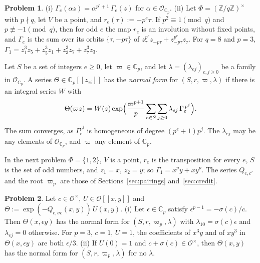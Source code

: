 \documentclass[reqno]{amsart}
\theoremstyle{definition}
\newtheorem{problem}{Problem}[section]
\theoremstyle{plain}
\newcommand{\Z}{\mathbb{Z}}
\newcommand{\Oc}{\mathcal{O}}
\newcommand{\C}{\mathbb{C}}
\newcommand{\Op}{\mathcal{O}_{\C_p}}
\begin{document}
\begin{problem}\label{pr:coupling}
(i) \(\Gamma_e(\alpha z) = \alpha^{p^e + 1}\, \Gamma_e(z)\) for \(\alpha \in \Op\).
(ii) Let \(\Phi = (\Z/q\Z)^\times\) with \(p \nmid q\), let \(V\) be a point, and \(r_e(\tau) := -p^e \tau\).  If \(p^2 \equiv 1 \pmod q\) and \(p \not\equiv -1 \pmod q\), then for odd \(e\) the map \(r_e\) is an involution without fixed points, and \(\Gamma_e\) is the sum over its orbits \(\{\tau, -p\tau\}\) of \(z_\tau^{p^e} z_{-p\tau} + z_{-p\tau}^{p^e} z_\tau\).  For \(q = 8\) and \(p = 3\), \(\Gamma_1 = z_1^3 z_5 + z_5^3 z_1 + z_3^3 z_7 + z_7^3 z_3\).
\end{problem}

Let \(S\) be a set of integers \(e \ge 0\), let \(\varpi \in \C_p\), and let \(\lambda = (\lambda_{ej})_{e, j \ge 0}\) be a family in \(\Op\).  A series \(\Theta \in \C_p[[z_{\tau i}]]\) has the \emph{normal form} for \((S, r, \varpi, \lambda)\) if there is an integral series \(W\) with
\[
  \Theta(\varpi z) = W(z) \exp\Bigl( \frac{\varpi^{p+1}}{p} \sum_{e \in S} \sum_{j \ge 0} \lambda_{ej}\, \Gamma_e^{\,p^j} \Bigr) .
\]
The sum converges, as \(\Gamma_e^{p^j}\) is homogeneous of degree \((p^e + 1)p^j\).  The \(\lambda_{ej}\) may be any elements of \(\Op\), and \(\varpi\) any element of \(\C_p\).

In the next problem \(\Phi = \{1, 2\}\), \(V\) is a point, \(r_e\) is the transposition for every \(e\), \(S\) is the set of odd numbers, and \(z_1 = x\), \(z_2 = y\); so \(\Gamma_1 = x^p y + x y^p\).  The series \(Q_{c,c'}\) and the root \(\varpi_p\) are those of Sections~\ref{sec:pairings} and~\ref{sec:credit}.

\begin{problem}\label{pr:nf-two}
Let \(c \in \Oc^\times\), \(U \in \Oc[[x,y]]\) and \(\Theta := \exp(-Q_{c,\sigma c}(x,y))\, U(x,y)\).
(i) Let \(\epsilon \in \C_p\) satisfy \(\epsilon^{p-1} = -\sigma(c)/c\).  Then \(\Theta(x, \epsilon y)\) has the normal form for \((S, r, \varpi_p, \lambda)\) with \(\lambda_{10} = \sigma(c)\epsilon\) and \(\lambda_{ej} = 0\) otherwise.  For \(p = 3\), \(c = 1\), \(U = 1\), the coefficients of \(x^3 y\) and of \(x y^3\) in \(\Theta(x, \epsilon y)\) are both \(\epsilon/3\).
(ii) If \(U(0) = 1\) and \(c + \sigma(c) \in \Oc^\times\), then \(\Theta(x,y)\) has the normal form for \((S, r, \varpi_p, \lambda)\) for no \(\lambda\).
\end{problem}
\end{document}
